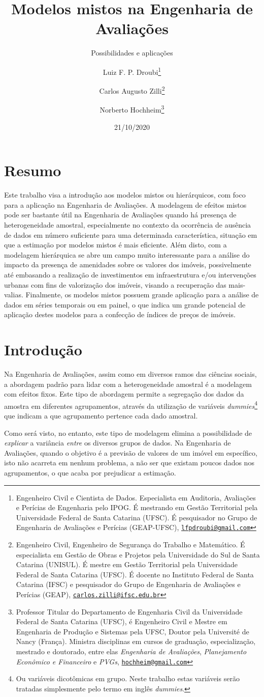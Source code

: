 \documentclass[
  a4paper, 11pt]{article}
\title{Modelos mistos na Engenharia de Avaliações}
\subtitle{Possibilidades e aplicações}
\author{Luiz F. P. Droubi\footnote{Engenheiro Civil e Cientista de Dados.
  Especialista em Auditoria, Avaliações e Perícias de Engenharia pelo
  IPOG. É mestrando em Gestão Territorial pela Universidade Federal de
  Santa Catarina (UFSC). É pesquisador no Grupo de Engenharia de
  Avaliações e Perícias (GEAP-UFSC),
  \href{mailto:lfpdroubi@gmail.com}{\nolinkurl{lfpdroubi@gmail.com}}} \and Carlos Augusto Zilli\footnote{Engenheiro Civil, Engenheiro de Segurança
  do Trabalho e Matemático. É especialista em Gestão de Obras e Projetos
  pela Universidade do Sul de Santa Catarina (UNISUL). É mestre em
  Gestão Territorial pela Universidade Federal de Santa Catarina (UFSC).
  É docente no Instituto Federal de Santa Catarina (IFSC) e pesquisador
  do Grupo de Engenharia de Avaliações e Perícias (GEAP),
  \href{mailto:carlos.zilli@ifsc.edu.br}{\nolinkurl{carlos.zilli@ifsc.edu.br}}} \and Norberto Hochheim\footnote{Professor Titular do Departamento de
  Engenharia Civil da Universidade Federal de Santa Catarina (UFSC), é
  Engenheiro Civil e Mestre em Engenharia de Produção e Sistemas pela
  UFSC, Doutor pela Université de Nancy (França). Ministra disciplinas
  em cursos de graduação, especialização, mestrado e doutorado, entre
  elas \emph{Engenharia de Avaliações}, \emph{Planejamento Econômico e
  Financeiro} e \emph{PVGs},
  \href{mailto:hochheim@gmail.com}{\nolinkurl{hochheim@gmail.com}}}}
\date{21/10/2020}
\begin{document}
\maketitle

\hypertarget{resumo}{%
\section*{Resumo}\label{resumo}}

Este trabalho visa a introdução aos modelos mistos ou hierárquicos, com
foco para a aplicação na Engenharia de Avaliações. A modelagem de
efeitos mistos pode ser bastante útil na Engenharia de Avaliações quando
há presença de heterogeneidade amostral, especialmente no contexto da
ocorrência de ausência de dados em número suficiente para uma
determinada característica, situação em que a estimação por modelos
mistos é mais eficiente. Além disto, com a modelagem hierárquica se abre
um campo muito interessante para a análise do impacto da presença de
amenidades sobre os valores dos imóveis, possivelmente até embasando a
realização de investimentos em infraestrutura e/ou intervenções urbanas
com fins de valorização dos imóveis, visando a recuperação das
mais-valias. Finalmente, os modelos mistos possuem grande aplicação para
a análise de dados em séries temporais ou em painel, o que indica um
grande potencial de aplicação destes modelos para a confecção de índices
de preços de imóveis.

\hypertarget{introduuxe7uxe3o}{%
\section{Introdução}\label{introduuxe7uxe3o}}

Na Engenharia de Avaliações, assim como em diversos ramos das ciências
sociais, a abordagem padrão para lidar com a heterogeneidade amostral é
a modelagem com efeitos fixos. Este tipo de abordagem permite a
segregação dos dados da amostra em diferentes agrupamentos, através da
utilização de variáveis \emph{dummies}\footnote{Ou variáveis dicotômicas
  em grupo. Neste trabalho estas variáveis serão tratadas simplesmente
  pelo termo em inglês \emph{dummies}.} que indicam a que agrupamento
pertence cada dado amostral.

Como será visto, no entanto, este tipo de modelagem elimina a
possibilidade de \emph{explicar} a variância \emph{entre} os diversos
grupos de dados. Na Engenharia de Avaliações, quando o objetivo é a
previsão de valores de um imóvel em específico, isto não acarreta em
nenhum problema, a não ser que existam poucos dados nos agrupamentos, o
que acaba por prejudicar a estimação.
\end{document}
